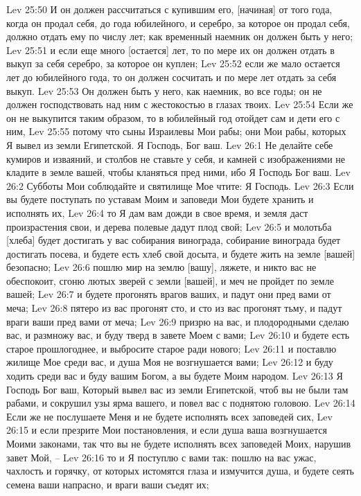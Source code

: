 Lev 25:50  И он должен рассчитаться с купившим его, [начиная] от того года, когда он продал себя, до года юбилейного, и серебро, за которое он продал себя, должно отдать ему по числу лет; как временный наемник он должен быть у него;
Lev 25:51  и если еще много [остается] лет, то по мере их он должен отдать в выкуп за себя серебро, за которое он куплен;
Lev 25:52  если же мало остается лет до юбилейного года, то он должен сосчитать и по мере лет отдать за себя выкуп.
Lev 25:53  Он должен быть у него, как наемник, во все годы; он не должен господствовать над ним с жестокостью в глазах твоих.
Lev 25:54  Если же он не выкупится таким образом, то в юбилейный год отойдет сам и дети его с ним,
Lev 25:55  потому что сыны Израилевы Мои рабы; они Мои рабы, которых Я вывел из земли Египетской. Я Господь, Бог ваш.
Lev 26:1  Не делайте себе кумиров и изваяний, и столбов не ставьте у себя, и камней с изображениями не кладите в земле вашей, чтобы кланяться пред ними, ибо Я Господь Бог ваш.
Lev 26:2  Субботы Мои соблюдайте и святилище Мое чтите: Я Господь.
Lev 26:3  Если вы будете поступать по уставам Моим и заповеди Мои будете хранить и исполнять их,
Lev 26:4  то Я дам вам дожди в свое время, и земля даст произрастения свои, и дерева полевые дадут плод свой;
Lev 26:5  и молотьба [хлеба] будет достигать у вас собирания винограда, собирание винограда будет достигать посева, и будете есть хлеб свой досыта, и будете жить на земле [вашей] безопасно;
Lev 26:6  пошлю мир на землю [вашу], ляжете, и никто вас не обеспокоит, сгоню лютых зверей с земли [вашей], и меч не пройдет по земле вашей;
Lev 26:7  и будете прогонять врагов ваших, и падут они пред вами от меча;
Lev 26:8  пятеро из вас прогонят сто, и сто из вас прогонят тьму, и падут враги ваши пред вами от меча;
Lev 26:9  призрю на вас, и плодородными сделаю вас, и размножу вас, и буду тверд в завете Моем с вами;
Lev 26:10  и будете есть старое прошлогоднее, и выбросите старое ради нового;
Lev 26:11  и поставлю жилище Мое среди вас, и душа Моя не возгнушается вами;
Lev 26:12  и буду ходить среди вас и буду вашим Богом, а вы будете Моим народом.
Lev 26:13  Я Господь Бог ваш, Который вывел вас из земли Египетской, чтоб вы не были там рабами, и сокрушил узы ярма вашего, и повел вас с поднятою головою.
Lev 26:14  Если же не послушаете Меня и не будете исполнять всех заповедей сих,
Lev 26:15  и если презрите Мои постановления, и если душа ваша возгнушается Моими законами, так что вы не будете исполнять всех заповедей Моих, нарушив завет Мой, --
Lev 26:16  то и Я поступлю с вами так: пошлю на вас ужас, чахлость и горячку, от которых истомятся глаза и измучится душа, и будете сеять семена ваши напрасно, и враги ваши съедят их;
